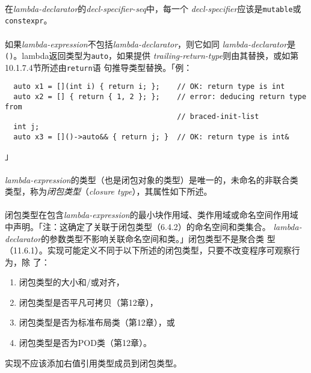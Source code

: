 \paragraph{}
在\textit{lambda-declarator}的\textit{decl-specifier-seq}中，每一个
\textit{decl-specifier}应该是\texttt{mutable}或\texttt{constexpr}。

\paragraph{}
如果\textit{lambda-expression}不包括\textit{lambda-declarator}，则它如同
\textit{lambda-declarator}是\texttt{()}。lambda返回类型为\texttt{auto}，如果提供
\textit{trailing-return-type}则由其替换，或如第10.1.7.4节所述由\texttt{return}语
句推导类型替换。「例：
\begin{lstlisting}
  auto x1 = [](int i) { return i; };    // OK: return type is int
  auto x2 = [] { return { 1, 2 }; };    // error: deducing return type from
                                        // braced-init-list
  int j;
  auto x3 = []()->auto&& { return j; }  // OK: return type is int&
\end{lstlisting}」

\paragraph{}
\textit{lambda-expression}的类型（也是闭包对象的类型）是唯一的，未命名的非联合类
类型，称为\textit{闭包类型}（\textit{closure type}），其属性如下所述。

\paragraph{}
闭包类型在包含\textit{lambda-expression}的最小块作用域、类作用域或命名空间作用域
中声明。「注：这确定了关联于闭包类型（6.4.2）的命名空间和类集合。
\textit{lambda-declarator}的参数类型不影响关联命名空间和类。」闭包类型不是聚合类
型（11.6.1）。实现可能定义不同于以下所述的闭包类型，只要不改变程序可观察行为，除
了：
\begin{enumerate}
  \item{闭包类型的大小和/或对齐，}
  \item{闭包类型是否平凡可拷贝（第12章），}
  \item{闭包类型是否为标准布局类（第12章），或}
  \item{闭包类型是否为POD类（第12章）。}
\end{enumerate}
实现不应该添加右值引用类型成员到闭包类型。


